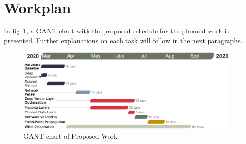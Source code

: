 \section{Workplan}

In fig~\ref{figure:gant}, a GANT chart with the proposed schedule for the
planned work is presented. Further explanations on each task will follow in the
next paragraphs.

\begin{figure}[!htbp]
    \includegraphics[width=1\textwidth]{Figures/gant2.png}
    \caption{GANT chart of Proposed Work}
    \label{figure:gant}
\end{figure}





